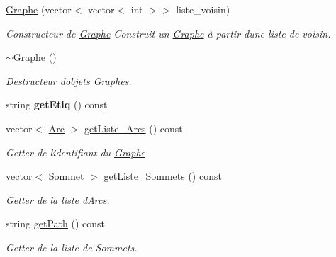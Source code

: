 \begin{DoxyCompactItemize}
\hyperlink{classGraphe_afae3a2bc32d94c1a830bca8e0b8753b0}{Graphe} (vector$<$ vector$<$ int $>$$>$ liste\+\_\+voisin)
\begin{DoxyCompactList}\small\item\em Constructeur de \hyperlink{classGraphe}{Graphe} Construit un \hyperlink{classGraphe}{Graphe} \`{a} partir d\textquotesingle{}une liste de voisin. \end{DoxyCompactList}\item 
\mbox{\label{classGraphe_a673c897db564767e9ace7169a5357310}} 
\hyperlink{classGraphe_a673c897db564767e9ace7169a5357310}{$\sim$\+Graphe} ()
\begin{DoxyCompactList}\small\item\em Destructeur d\textquotesingle{}objets Graphes. \end{DoxyCompactList}\item 
\mbox{\label{classGraphe_ac0868c53dbe9a489986e1837e79c5b2f}} 
string {\bfseries get\+Etiq} () const
\item 
\mbox{\label{classGraphe_a14e25421d8e7f61da768946f4ef05bc9}} 
vector$<$ \hyperlink{classArc}{Arc} $>$ \hyperlink{classGraphe_a14e25421d8e7f61da768946f4ef05bc9}{get\+Liste\+\_\+\+Arcs} () const
\begin{DoxyCompactList}\small\item\em Getter de l\textquotesingle{}identifiant du \hyperlink{classGraphe}{Graphe}. \end{DoxyCompactList}\item 
\mbox{\label{classGraphe_ac8688830a2c733962216f851b23b5a9f}} 
vector$<$ \hyperlink{classSommet}{Sommet} $>$ \hyperlink{classGraphe_ac8688830a2c733962216f851b23b5a9f}{get\+Liste\+\_\+\+Sommets} () const
\begin{DoxyCompactList}\small\item\em Getter de la liste d\textquotesingle{}Arcs. \end{DoxyCompactList}\item 
\mbox{\label{classGraphe_accd124066f3953df54c1f5fb73d39b54}} 
string \hyperlink{classGraphe_accd124066f3953df54c1f5fb73d39b54}{get\+Path} () const
\begin{DoxyCompactList}\small\item\em Getter de la liste de Sommets. \end{DoxyCompactList}\item 
$$
\end{DoxyCompactItemize}
